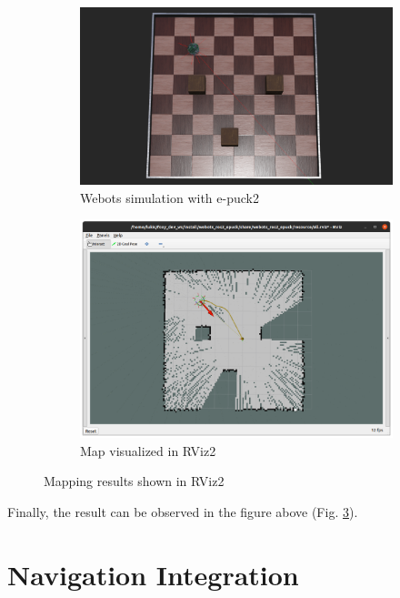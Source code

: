 \begin{figure}[H]
\centering
\begin{subfigure}{.95\textwidth}
  \centering
  \includegraphics[width=\linewidth]{demos/figures/map_webots.png}
  \caption{Webots simulation with e-puck2}
  \label{fig:demos:mapping:map_webots}
\end{subfigure}
\begin{subfigure}{.95\textwidth}
  \centering
  \includegraphics[width=\linewidth]{demos/figures/map_rviz.png}
  \caption{Map visualized in RViz2}
  \label{fig:demos:mapping:map_rviz}
\end{subfigure}
\caption{Mapping results shown in RViz2}
\label{fig:demos:mapping}
\end{figure}

Finally, the result can be observed in the figure above (Fig. \ref{fig:demos:mapping}).

\section{Navigation Integration}
\label{sec:demos:navigation}

